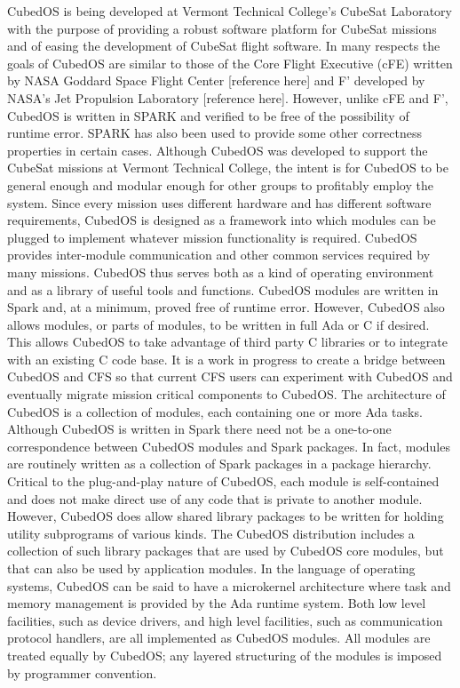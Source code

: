 CubedOS is being developed at Vermont Technical College’s CubeSat
Laboratory with the purpose of providing a robust software platform
for CubeSat missions and of easing the development of CubeSat flight
software. In many respects the goals of CubedOS are similar to those
of the Core Flight Executive (cFE) written by NASA Goddard Space
Flight Center [reference here] and F’ developed by NASA’s Jet
Propulsion Laboratory [reference here].  However, unlike cFE and F’,
CubedOS is written in SPARK and verified to be free of the possibility
of runtime error. SPARK has also been used to provide some other
correctness properties in certain cases.  Although CubedOS was
developed to support the CubeSat missions at Vermont Technical
College, the intent is for CubedOS to be general enough and modular
enough for other groups to profitably employ the system. Since every
mission uses different hardware and has different software
requirements, CubedOS is designed as a framework into which modules
can be plugged to implement whatever mission functionality is
required. CubedOS provides inter-module communication and other common
services required by many missions. CubedOS thus serves both as a kind
of operating environment and as a library of useful tools and
functions.  CubedOS modules are written in Spark and, at a minimum,
proved free of runtime error. However, CubedOS also allows modules, or
parts of modules, to be written in full Ada or C if desired. This
allows CubedOS to take advantage of third party C libraries or to
integrate with an existing C code base. It is a work in progress to
create a bridge between CubedOS and CFS so that current CFS users can
experiment with CubedOS and eventually migrate mission critical
components to CubedOS.  The architecture of CubedOS is a collection of
modules, each containing one or more Ada tasks. Although CubedOS is
written in Spark there need not be a one-to-one correspondence between
CubedOS modules and Spark packages. In fact, modules are routinely
written as a collection of Spark packages in a package hierarchy.
Critical to the plug-and-play nature of CubedOS, each module is
self-contained and does not make direct use of any code that is
private to another module. However, CubedOS does allow shared library
packages to be written for holding utility subprograms of various
kinds. The CubedOS distribution includes a collection of such library
packages that are used by CubedOS core modules, but that can also be
used by application modules.  In the language of operating systems,
CubedOS can be said to have a microkernel architecture where task and
memory management is provided by the Ada runtime system. Both low
level facilities, such as device drivers, and high level facilities,
such as communication protocol handlers, are all implemented as
CubedOS modules. All modules are treated equally by CubedOS; any
layered structuring of the modules is imposed by programmer
convention.
